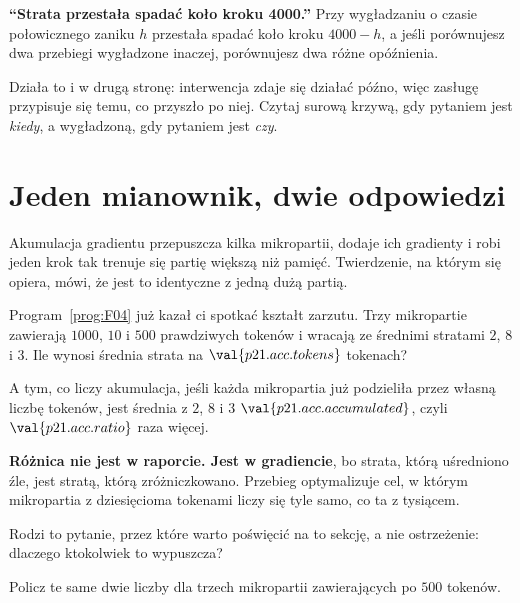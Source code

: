 \begin{fr}
\begin{trapbox}
\textbf{\enquote{Strata przestała spadać koło kroku 4000.}} Przy wygładzaniu o
czasie połowicznego zaniku $h$ przestała spadać koło kroku $4000 - h$, a jeśli
porównujesz dwa przebiegi wygładzone inaczej, porównujesz dwa różne opóźnienia.

Działa to i w drugą stronę: interwencja zdaje się działać późno, więc zasługę
przypisuje się temu, co przyszło po niej. Czytaj surową krzywą, gdy pytaniem
jest \emph{kiedy}, a wygładzoną, gdy pytaniem jest \emph{czy}.
\end{trapbox}
\end{fr}

\section{Jeden mianownik, dwie odpowiedzi}
\label{sec:P21-accumulation}

\begin{fr}
Akumulacja gradientu przepuszcza kilka mikropartii, dodaje ich gradienty i
robi jeden krok \dash{} tak trenuje się partię większą niż pamięć. Twierdzenie,
na którym się opiera, mówi, że jest to identyczne z jedną dużą partią.

Program~\ref{prog:F04} już kazał ci spotkać kształt zarzutu. Trzy mikropartie
zawierają $1000$, $10$ i $500$ prawdziwych tokenów i wracają ze średnimi
stratami $2$, $8$ i $3$. Ile wynosi średnia strata na
$\val{p21.acc.tokens}$ tokenach?
\dotline
\nextframe
\end{fr}

\begin{fr}
A tym, co liczy akumulacja, jeśli każda mikropartia już podzieliła przez własną
liczbę tokenów, jest średnia z $2$, $8$ i $3$ \dash{}
$\val{p21.acc.accumulated}$, czyli $\val{p21.acc.ratio}$ raza więcej.

\textbf{Różnica nie jest w raporcie. Jest w gradiencie}, bo strata, którą
uśredniono źle, jest stratą, którą zróżniczkowano. Przebieg optymalizuje cel, w
którym mikropartia z dziesięcioma tokenami liczy się tyle samo, co ta z
tysiącem.
\end{fr}

\begin{fr}
Rodzi to pytanie, przez które warto poświęcić na to sekcję, a nie ostrzeżenie:
dlaczego ktokolwiek to wypuszcza?

Policz te same dwie liczby dla trzech mikropartii zawierających po $500$
tokenów.
\nextframe
\end{fr}


